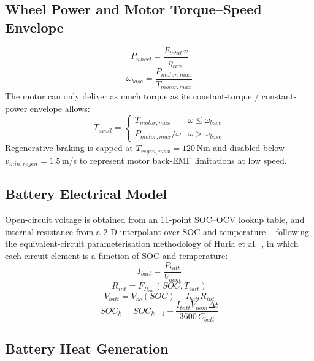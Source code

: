 \documentclass[10pt,conference]{IEEEtran}
\begin{document}
\subsection{Wheel Power and Motor Torque--Speed Envelope}

\begin{equation}
P_{wheel} = \frac{F_{total}\,v}{\eta_{tire}}
\end{equation}
\begin{equation}
\omega_{base} = \frac{P_{motor,max}}{T_{motor,max}}
\end{equation}
The motor can only deliver as much torque as its constant-torque / constant-power envelope allows:
\begin{equation}
T_{avail} = \begin{cases}
T_{motor,max} & \omega \le \omega_{base} \\
P_{motor,max}/\omega & \omega > \omega_{base}
\end{cases}
\end{equation}
Regenerative braking is capped at $T_{regen,max}=120$\,Nm and disabled below $v_{min,regen}=1.5$\,m/s to represent motor back-EMF limitations at low speed.

\subsection{Battery Electrical Model}

Open-circuit voltage is obtained from an 11-point SOC--OCV lookup table, and internal resistance from a 2-D interpolant over SOC and temperature -- following the equivalent-circuit parameterisation methodology of Huria et al.~\cite{huria2012}, in which each circuit element is a function of SOC and temperature:
\begin{equation}
I_{batt} = \frac{P_{batt}}{V_{nom}}
\end{equation}
\begin{equation}
R_{int} = F_{R_{int}}(SOC, T_{batt})
\end{equation}
\begin{equation}
V_{batt} = V_{oc}(SOC) - I_{batt}R_{int}
\end{equation}
\begin{equation}
SOC_k = SOC_{k-1} - \frac{I_{batt}V_{nom}\Delta t}{3600\,C_{batt}}
\end{equation}

\subsection{Battery Heat Generation}
\end{document}
